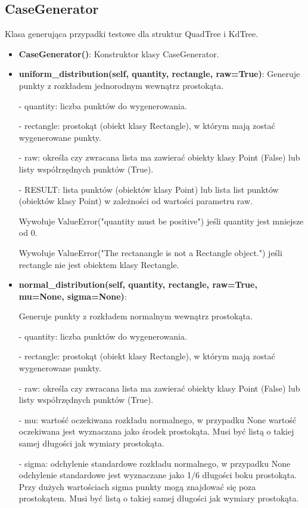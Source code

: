 \documentclass{lab}
\begin{document}
\subsection{CaseGenerator}
Klasa generująca przypadki testowe dla struktur QuadTree i KdTree.
\begin{itemize}
  \item \textbf{CaseGenerator()}:
  Konstruktor klasy CaseGenerator.
  \item \textbf{uniform\_distribution(self, quantity, rectangle, raw=True)}:
  Generuje punkty z rozkładem jednorodnym wewnątrz prostokąta.

  - quantity: liczba punktów do wygenerowania.

  - rectangle: prostokąt (obiekt klasy Rectangle), w którym mają zostać wygenerowane punkty.

  - raw: określa czy zwracana lista ma zawierać obiekty klasy Point (False) lub listy współrzędnych punktów (True).

  - RESULT: lista punktów (obiektów klasy Point) lub lista list punktów (obiektów klasy Point) w zależności od wartości parametru raw.

  Wywołuje ValueError("quantity must be positive") jeśli quantity jest mniejsze od 0.

  Wywołuje ValueError("The rectanangle is not a Rectangle object.") jeśli rectangle nie jest obiektem klasy Rectangle.

  \item \textbf{normal\_distribution(self, quantity, rectangle, raw=True, mu=None, sigma=None)}:

  Generuje punkty z rozkładem normalnym wewnątrz prostokąta.

  - quantity: liczba punktów do wygenerowania.

  - rectangle: prostokąt (obiekt klasy Rectangle), w którym mają zostać wygenerowane punkty.

  - raw: określa czy zwracana lista ma zawierać obiekty klasy Point (False) lub listy współrzędnych punktów (True).

  - mu: wartość oczekiwana rozkładu normalnego, w przypadku None wartość oczekiwana jest wyznaczana jako środek prostokąta. Musi być listą o takiej samej długości jak wymiary prostokąta.

  - sigma: odchylenie standardowe rozkładu normalnego, w przypadku None odchylenie standardowe jest wyznaczane jako 1/6 długości boku prostokąta. Przy dużych wartościach sigma punkty mogą znajdować się poza prostokątem. Musi być listą o takiej samej długości jak wymiary prostokąta.


\end{itemize}
\end{document}
